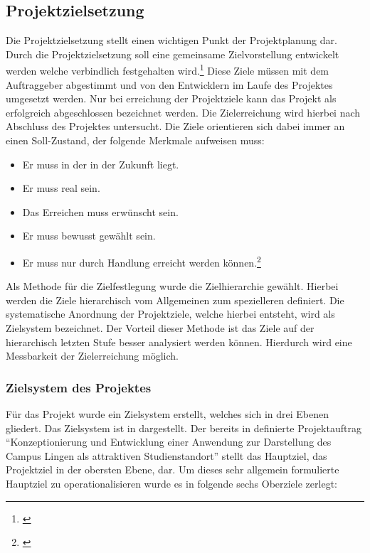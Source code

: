 \subsection{Projektzielsetzung}
\label{sec:Projektzielsetzung}

Die Projektzielsetzung stellt einen wichtigen Punkt der Projektplanung dar.
Durch die Projektzielsetzung soll eine gemeinsame Zielvorstellung entwickelt
werden welche verbindlich festgehalten wird.\footnote{\citet[S.~34]{litke2007}}
Diese Ziele müssen mit dem Auftraggeber abgestimmt und von den Entwicklern im
Laufe des Projektes umgesetzt werden. Nur bei erreichung der Projektziele kann
das Projekt als erfolgreich abgeschlossen bezeichnet werden. Die Zielerreichung
wird hierbei nach Abschluss des Projektes untersucht. Die Ziele orientieren
sich dabei immer an einen Soll-Zustand, der folgende Merkmale aufweisen muss:

\begin{itemize}
  \item Er muss in der in der Zukunft liegt.
  \item Er muss real sein.
  \item Das Erreichen muss erwünscht sein.
  \item Er muss bewusst gewählt sein.
  \item Er muss nur durch Handlung erreicht werden
  können.\footnote{\citet[S.~33]{litke2007}}
\end{itemize}

Als Methode für die Zielfestlegung wurde die Zielhierarchie gewählt. Hierbei
werden die Ziele hierarchisch vom Allgemeinen zum spezielleren definiert. Die
systematische Anordnung der Projektziele, welche hierbei entsteht, wird als
Zielsystem bezeichnet. Der Vorteil dieser Methode ist das Ziele auf der
hierarchisch letzten Stufe besser analysiert werden können. Hierdurch wird eine
Messbarkeit der Zielerreichung möglich. 

\subsubsection{Zielsystem des Projektes}
\label{sec:Zielsystem}

Für das Projekt wurde ein Zielsystem erstellt, welches sich in drei Ebenen
gliedert. Das Zielsystem ist in  dargestellt. Der bereits in
 definierte Projektauftrag "`Konzeptionierung und
Entwicklung einer Anwendung zur Darstellung des Campus Lingen als attraktiven
Studienstandort"' stellt das Hauptziel, das Projektziel in der obersten Ebene,
dar. Um dieses sehr allgemein formulierte Hauptziel zu operationalisieren wurde
es in folgende sechs Oberziele zerlegt:

